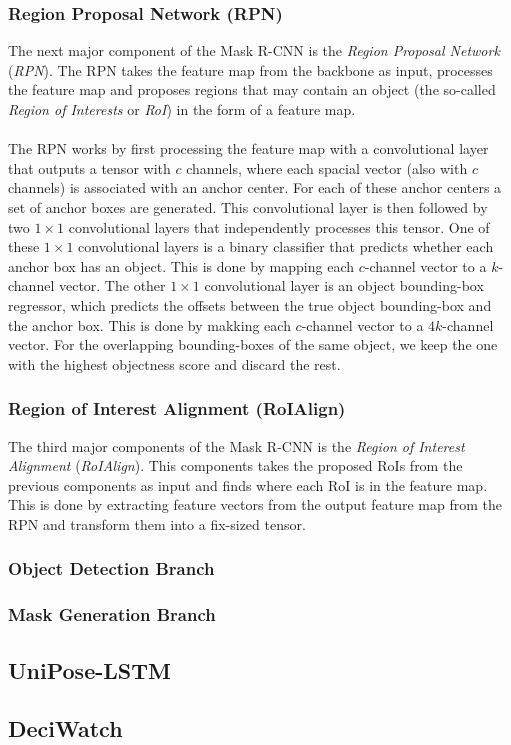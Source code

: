 \documentclass[./main.tex]{subfiles}
\begin{document}
\subsubsection{Region Proposal Network (RPN)}
The next major component of the Mask R-CNN is the \textit{Region Proposal Network} (\textit{RPN}). The RPN takes the feature map from the backbone as input, processes the feature map and proposes regions that may contain an object (the so-called \textit{Region of Interests} or \textit{RoI}) in the form of a feature map. 
\\
\\
The RPN works by first processing the feature map with a convolutional layer that outputs a tensor with $c$ channels, where each spacial vector (also with $c$ channels) is associated with an anchor center. For each of these anchor centers a set of anchor boxes are generated. This convolutional layer is then followed by two $1 \times 1$ convolutional layers that independently processes this tensor. One of these $1 \times 1$ convolutional layers is a binary classifier that predicts whether each anchor box has an object. This is done by mapping each $c$-channel vector to a $k$-channel vector. The other $1 \times 1$ convolutional layer is an object bounding-box regressor, which predicts the offsets between the true object bounding-box and the anchor box. This is done by makking each $c$-channel vector to a $4k$-channel vector. For the overlapping bounding-boxes of the same object, we keep the one with the highest objectness score and discard the rest.

\subsubsection{Region of Interest Alignment (RoIAlign)}
The third major components of the Mask R-CNN is the \textit{Region of Interest Alignment} (\textit{RoIAlign}). This components takes the proposed RoIs from the previous components as input and finds where each RoI is in the feature map. This is done by extracting feature vectors from the output feature map from the RPN and transform them into a fix-sized tensor.

\subsubsection{Object Detection Branch}
\subsubsection{Mask Generation Branch}


\subsection{UniPose-LSTM}

\subsection{DeciWatch}
\end{document}
